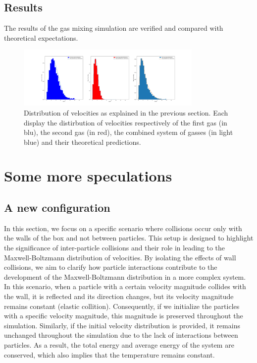\documentclass{article}
\begin{document}
\subsection{Results}
The results of the gas mixing simulation are verified and compared with theoretical expectations. 
\begin{figure}[h] %
    \centering
    \includegraphics[width=0.8\textwidth]{Mixed_gas_dis.png} %
    \caption{Distribution of velocities as explained in the previous section. Each display the distirbution of velocities respectively of the first gas (in blu), the second gas (in red), the combined system of gasses (in light blue) and their theoretical predictions.}
    \label{fig:velocity_distributions} %
\end{figure}

\section{Some more speculations}
\subsection{A new configuration}
In this section, we focus on a specific scenario where collisions occur only with the walls of the box and not between particles. This setup is designed to highlight the significance of inter-particle collisions and their role in leading to the Maxwell-Boltzmann distribution of velocities. By isolating the effects of wall collisions, we aim to clarify how particle interactions contribute to the development of the Maxwell-Boltzmann distribution in a more complex system.
In this scenario, when a particle with a certain velocity magnitude collides with the wall, it is reflected and its direction changes, but its velocity magnitude remains constant (elastic collition). Consequently, if we initialize the particles with a specific velocity magnitude, this magnitude is preserved throughout the simulation. Similarly, if the initial velocity distribution is provided, it remains unchanged throughout the simulation due to the lack of interactions between particles. As a result, the total energy and average energy of the system are conserved, which also implies that the temperature remains constant.
\end{document}
